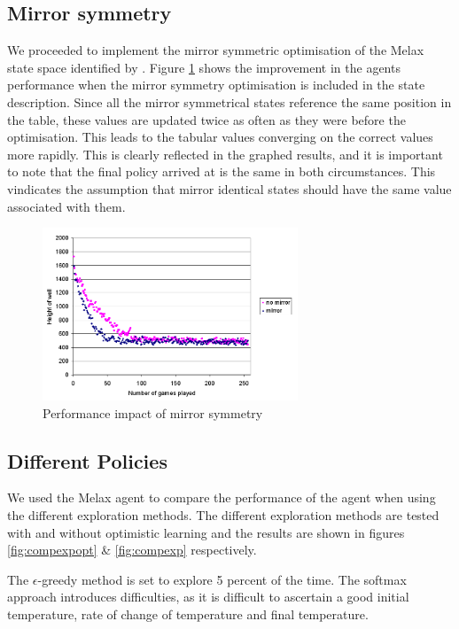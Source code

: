 \documentclass{rucsthesis}
\begin{document}
\subsection{Mirror symmetry}

We proceeded to implement the mirror symmetric optimisation of the Melax state space identified by \cite{yaeltetris}. Figure \ref{fig:comparemelax} shows the improvement in the agents performance when the mirror symmetry optimisation is included in the state description. Since all the mirror symmetrical states reference the same position in the table, these values are updated twice as often as they were before the optimisation. This leads to the tabular values converging on the correct values more rapidly. This is clearly reflected in the graphed results, and it is important to note that the final policy arrived at is the same in both circumstances. This vindicates the assumption that mirror identical states should have the same value associated with them.

\begin{figure}[h]
\centering
\includegraphics[width=3in]{mirrormelax.png}
\caption{Performance impact of mirror symmetry}
\label{fig:comparemelax}
\end{figure}

\subsection{Different Policies}

We used the Melax agent to compare the performance of the agent when using the different exploration methods. The different exploration methods are tested with and without optimistic learning and the results are shown in figures \ref{fig:compexpopt} \& \ref{fig:compexp} respectively.

The $\epsilon$-greedy method is set to explore 5 percent of the time. The softmax approach introduces difficulties, as it is difficult to ascertain a good initial temperature, rate of change of temperature and final temperature.
\end{document}

